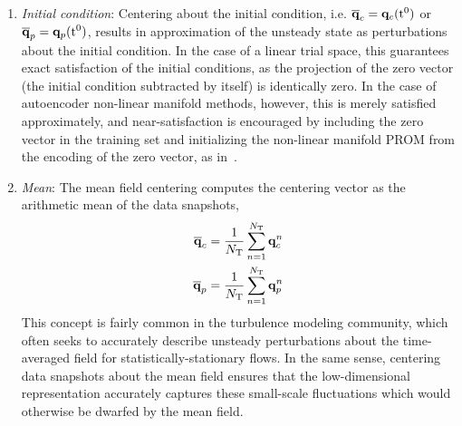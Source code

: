 \begin{enumerate}
	\item \textit{Initial condition}: Centering about the initial condition, i.e. $\mathbf{\overline{q}}_{c} = \mathbf{q}_{c}(\text{t}^0)$ or $\mathbf{\overline{q}}_{p} = \mathbf{q}_{p}(\text{t}^0)$, results in approximation of the unsteady state as perturbations about the initial condition. In the case of a linear trial space, this guarantees exact satisfaction of the initial conditions, as the projection of the zero vector (the initial condition subtracted by itself) is identically zero. In the case of autoencoder non-linear manifold methods, however, this is merely satisfied approximately, and near-satisfaction is encouraged by including the zero vector in the training set and initializing the non-linear manifold PROM from the encoding of the zero vector, as in~\cite{Lee2020}.

	\item \textit{Mean}: The mean field centering computes the centering vector as the arithmetic mean of the data snapshots,
	\begin{align}
		\mathbf{\overline{q}}_{c} &= \frac{1}{N_{\text{T}}} \sum_{n=1}^{N_{\text{T}}} \mathbf{q}_{c}^{n} \label{eq:meanCentCons}\\
		\mathbf{\overline{q}}_{p} &= \frac{1}{N_{\text{T}}} \sum_{n=1}^{N_{\text{T}}} \mathbf{q}_{p}^{n} \label{eq:meanCentPrim}
	\end{align}
	This concept is fairly common in the turbulence modeling community, which often seeks to accurately describe unsteady perturbations about the time-averaged field for statistically-stationary flows. In the same sense, centering data snapshots about the mean field ensures that the low-dimensional representation accurately captures these small-scale fluctuations which would otherwise be dwarfed by the mean field.


\end{enumerate}
